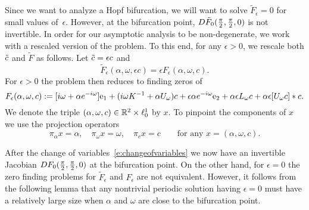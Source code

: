 Since we want to analyze a Hopf bifurcation, we will want to solve $\tilde{F}_\epsilon = 0$ for small values of~$\epsilon$. 
However, at the bifurcation point, $ D \tilde{F}_0(\tfrac{\pi}{2}  ,\tfrac{\pi}{2} , 0)$ is not invertible.
In order for our asymptotic analysis to be non-degenerate,
we work with a rescaled version of the problem. To this end, for any $\epsilon >0$, we rescale both $\tilde{c}$ and $\tilde{F}$ as follows. Let $\tilde{c} = \epsilon c$ and 
\begin{equation}\label{e:changeofvariables}
  \tilde{F}_\epsilon (\alpha,\omega,\epsilon c) = \epsilon F_\epsilon (\alpha,\omega,c).
\end{equation}
For $\epsilon>0$ the problem then reduces to finding zeros of 
\begin{equation}
\label{eq:FDefinition}
	F_\epsilon(\alpha,\omega, c) := 
	[i \omega + \alpha e^{-i \omega}] \mathrm{e}_1 + 
	( i \omega K^{-1} + \alpha U_{\omega}) c + 
	\epsilon \alpha e^{-i \omega} \mathrm{e}_2  +
	\alpha \epsilon L_\omega c + 
	\alpha \epsilon [ U_{\omega} c] * c.
\end{equation}
We denote the triple $(\alpha,\omega,c) \in \mathbb{R}^2 \times \ell^1_0$ by $x$.
To pinpoint the components of $x$ we use the projection operators
\[
   \pi_\alpha x = \alpha, \quad \pi_\omega x = \omega, \quad 
  \pi_c x = c \qquad\text{for any } x=(\alpha,\omega,c).
\]

After the change of variables~\eqref{e:changeofvariables} we now have an invertible Jacobian $D F_0(\tfrac{\pi}{2}  ,\tfrac{\pi}{2} , 0)$ at the bifurcation point.
On the other hand, for $\epsilon=0$ the zero finding problems for $\tilde{F}_\epsilon$ and $F_\epsilon$ are not equivalent. 
However, it follows from the following lemma that any nontrivial periodic solution having $ \epsilon=0$ must have a relatively large size when $ \alpha $ and $ \omega $ are close to the bifurcation point. 

